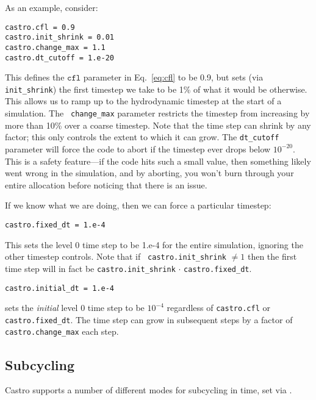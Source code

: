 As an example, consider:
\begin{lstlisting}
castro.cfl = 0.9 
castro.init_shrink = 0.01 
castro.change_max = 1.1
castro.dt_cutoff = 1.e-20
\end{lstlisting}
This defines the $\mathtt{cfl}$ parameter in Eq.~\ref{eq:cfl} to be
0.9, but sets (via {\tt init\_shrink}) the first timestep we take to
be 1\% of what it would be otherwise.  This allows us to ramp up to
the hydrodynamic timestep at the start of a simulation.  The {\tt
  change\_max} parameter restricts the timestep from increasing by
more than 10\% over a coarse timestep.  Note that the time step can
shrink by any factor; this only controls the extent to which it can
grow.  The {\tt dt\_cutoff} parameter will force the code to abort if
the timestep ever drops below $10^{-20}$.  This is a safety
feature---if the code hits such a small value, then something likely
went wrong in the simulation, and by aborting, you won't burn through
your entire allocation before noticing that there is an issue.

If we know what we are doing, then we can force a particular timestep:
\begin{lstlisting}
castro.fixed_dt = 1.e-4
\end{lstlisting}
This sets the level 0 time step to be 1.e-4 for the entire simulation,
ignoring the other timestep controls.  Note that if {\tt
  castro.init\_shrink} $\neq 1$ then the first time step will in fact
be {\tt castro.init\_shrink} $\cdot$ {\tt castro.fixed\_dt}. \newline

\begin{lstlisting}
castro.initial_dt = 1.e-4
\end{lstlisting}
sets the {\it initial} level 0 time step to be $10^{-4}$ regardless of 
{\tt castro.cfl} or {\tt castro.fixed\_dt}.  The time step can
grow in subsequent steps by a factor of {\tt castro.change\_max} each step.


\subsection{Subcycling}
Castro supports a number of different modes for subcycling in time,
set via .

